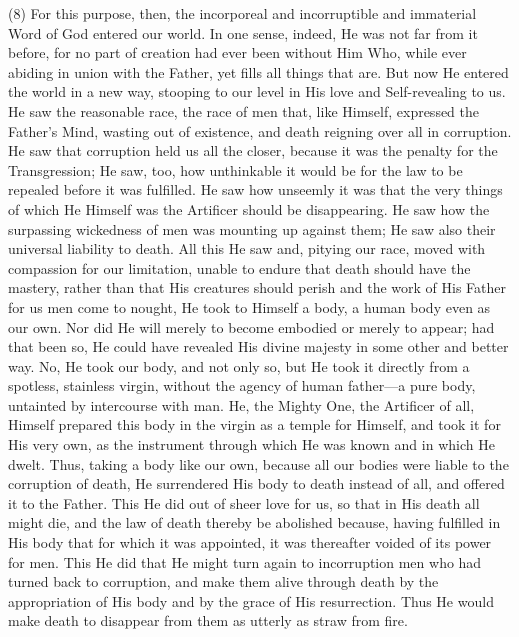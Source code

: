 \documentclass[9pt, twocolumn, oneside, a4paper]{memoir}
\begin{document}
\textsc{(8)} For this purpose, then, the incorporeal and       incorruptible and immaterial Word of God entered our world. In one sense,       indeed, He was not far from it before, for no part of creation had ever been       without Him Who, while ever abiding in union with the Father, yet fills all       things that are. But now He entered the world in a new way, stooping to our       level in His love and Self-revealing to us. He saw the reasonable race, the race       of men that, like Himself, expressed the Father's Mind, wasting out of       existence, and death reigning over all in corruption. He saw that corruption       held us all the closer, because it was the penalty for the Transgression; He       saw, too, how unthinkable it would be for the law to be repealed before it was       fulfilled. He saw how unseemly it was that the very things of which He Himself       was the Artificer should be disappearing. He saw how the surpassing wickedness       of men was mounting up against them; He saw also their universal liability to       death. All this He saw and, pitying our race, moved with compassion for our       limitation, unable to endure that death should have the mastery, rather than       that His creatures should perish and the work of His Father for us men come to       nought, He took to Himself a body, a human body even as our own. Nor did He will       merely to become embodied or merely to appear; had that been so, He could have       revealed His divine majesty in some other and better way. No, He took our body,       and not only so, but He took it directly from a spotless, stainless virgin,       without the agency of human father—a pure body, untainted by intercourse with       man. He, the Mighty One, the Artificer of all, Himself prepared this body in the       virgin as a temple for Himself, and took it for His very own, as the instrument       through which He was known and in which He dwelt. Thus, taking a body like our       own, because all our bodies were liable to the corruption of death, He       surrendered His body to       death instead of all, and offered it to the Father. This       He did out of sheer love for us, so that in His death all might die, and the law       of death thereby be abolished because, having fulfilled in His body that for       which it was appointed, it was thereafter voided of its power for men. This He       did that He might turn again to incorruption men who had turned back to       corruption, and make them alive through death by the appropriation of His body       and by the grace of His resurrection. Thus He would make death to disappear from       them as utterly as straw from fire.   
\end{document}
